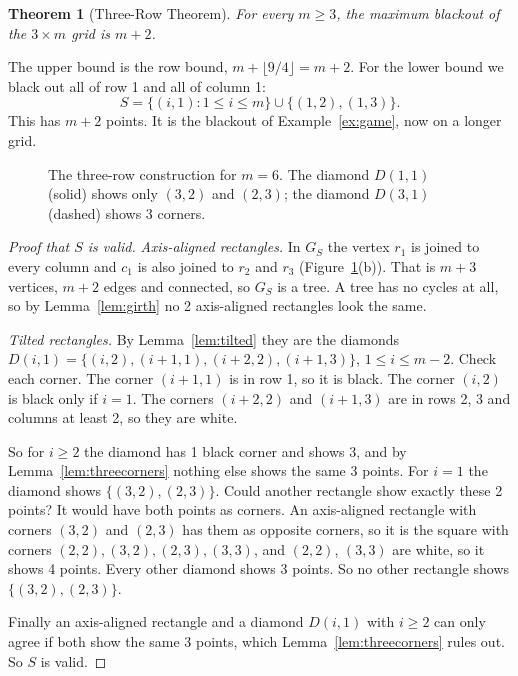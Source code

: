 \documentclass[11pt]{article}
\newtheorem{theorem}{Theorem}[section]
\theoremstyle{definition}
\theoremstyle{remark}
\begin{document}
\begin{theorem}[Three-Row Theorem]\label{thm:threerow}
For every $m\ge3$, the maximum blackout of the $3\times m$ grid is $m+2$.
\end{theorem}

The upper bound is the row bound, $m+\lfloor9/4\rfloor=m+2$. For the lower bound we black out
all of row 1 and all of column 1:
\[
S=\{(i,1):1\le i\le m\}\cup\{(1,2),(1,3)\}.
\]
This has $m+2$ points. It is the blackout of Example~\ref{ex:game}, now on a longer grid.

\begin{figure}[htbp]
\centering

\caption{The three-row construction for $m=6$. The diamond $D(1,1)$ (solid) shows only $(3,2)$
and $(2,3)$; the diamond $D(3,1)$ (dashed) shows 3 corners.}
\label{fig:three}
\end{figure}

\begin{proof}[Proof that $S$ is valid]
\emph{Axis-aligned rectangles.} In $G_S$ the vertex $r_1$ is joined to every column and $c_1$ is
also joined to $r_2$ and $r_3$ (Figure~\ref{fig:three}(b)). That is $m+3$ vertices, $m+2$ edges
and connected, so $G_S$ is a tree. A tree has no cycles at all, so by Lemma~\ref{lem:girth} no 2
axis-aligned rectangles look the same.

\emph{Tilted rectangles.} By Lemma~\ref{lem:tilted} they are the diamonds
$D(i,1)=\{(i,2),(i+1,1),(i+2,2),(i+1,3)\}$, $1\le i\le m-2$. Check each corner. The corner
$(i+1,1)$ is in row 1, so it is black. The corner $(i,2)$ is black only if $i=1$. The corners
$(i+2,2)$ and $(i+1,3)$ are in rows 2, 3 and columns at least 2, so they are white.

So for $i\ge2$ the diamond has 1 black corner and shows 3, and by
Lemma~\ref{lem:threecorners} nothing else shows the same 3 points. For $i=1$ the diamond shows
$\{(3,2),(2,3)\}$. Could another rectangle show exactly these 2 points? It would have both
points as corners. An axis-aligned rectangle with corners $(3,2)$ and $(2,3)$ has them as
opposite corners, so it is the square with corners $(2,2),(3,2),(2,3),(3,3)$, and $(2,2)$,
$(3,3)$ are white, so it shows 4 points. Every other diamond shows 3 points. So no other
rectangle shows $\{(3,2),(2,3)\}$.

Finally an axis-aligned rectangle and a diamond $D(i,1)$ with $i\ge2$ can only agree if both
show the same 3 points, which Lemma~\ref{lem:threecorners} rules out. So $S$ is valid.
\end{proof}
\end{document}
